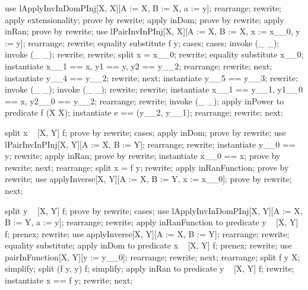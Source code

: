 \begin{LPScript}\begin{forget}[lHomogeneousElemDomNRresPInj]
use lApplyInvInDomPInj[X, X][A := X, B := X, a := y];
rearrange;
rewrite;
apply extensionality;
prove by rewrite;
apply inDom;
prove by rewrite;
apply inRan;
prove by rewrite;
use lPairInvInPInj[X, X][A := X, B := X, x := x\_\_0, y := y];
rearrange;
rewrite;
equality substitute f \inv[X, X] y;
cases;
cases;
invoke (\_ \pinj \_);
invoke (\_ \pfun \_);
rewrite;
rewrite;
split x = x\_\_0;
rewrite;
equality substitute x\_\_0;
instantiate x\_\_1 == x, y1 == y, y2 == y\_\_2;
rearrange;
rewrite;
next;
instantiate y\_\_4 == y\_\_2;
rewrite;
next;
instantiate y\_\_5 == y\_\_3;
rewrite;
invoke (\_ \pinj \_);
invoke (\_ \pfun \_);
rewrite;
rewrite;
instantiate x\_\_1 == y\_\_1, y1\_\_0 == x, y2\_\_0 == y\_\_2;
rearrange;
rewrite;
invoke (\_ \rel \_);
apply inPower to predicate f \in \power (X \cross X);
instantiate e == (y\_\_2, y\_\_1);
rearrange;
rewrite;
next;
\end{forget}\end{LPScript}

\begin{LPScript}\begin{forget}[lInDomInjection]
split x \in  \dom~ [X, Y] f;
prove by rewrite;
cases;
apply inDom;
prove by rewrite;
use lPairInvInPInj[X, Y][A := X, B := Y];
rearrange;
rewrite;
instantiate y\_\_0 == y;
rewrite;
apply inRan;
prove by rewrite;
instantiate x\_\_0 == x;
prove by rewrite;
next;
rearrange;
split x = f \inv [X, Y] y;
rewrite;
apply inRanFunction;
prove by rewrite;
use applyInverse[X, Y][A := X, B := Y, x := x\_\_0];
prove by rewrite;
next;
\end{forget}\end{LPScript}

\begin{LPScript}\begin{forget}[lInRanInjection]
split y \in  \ran~ [X, Y] f;
prove by rewrite;
cases;
use lApplyInvInDomPInj[X, Y][A := X, B := Y, a := y];
rearrange;
rewrite;
apply inRanFunction to predicate y \in  \ran~ [X, Y] f;
prenex;
rewrite;
use applyInverse[X, Y][A := X, B := Y];
rearrange;
rewrite;
equality substitute;
apply inDom to predicate x \in  \dom~  [X, Y] f;
prenex;
rewrite;
use pairInFunction[X, Y][y := y\_\_0];
rearrange;
rewrite;
next;
rearrange;
split f \inv [X, Y] y \in  X;
simplify;
split (f \inv [X, Y] y, y) \in  f;
simplify;
apply inRan to predicate y \in  \ran~ [X, Y] f;
rewrite;
instantiate x == f \inv [X, Y] y;
rewrite;
next;
\end{forget}\end{LPScript}

